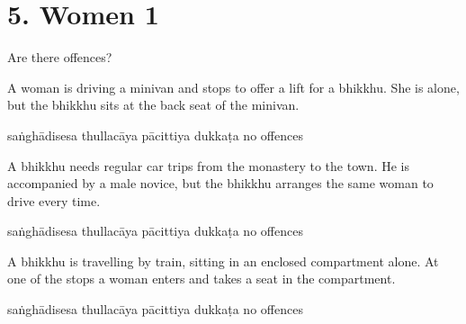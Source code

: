 \chapter{5. Women 1}
\renewcommand*{\theChapterTitle}{5. Women 1}

\begin{exam}{\autoExamName}

\begin{problem*}

Are there offences?

\begin{parts}

\item A woman is driving a minivan and stops to offer a lift for a bhikkhu.
  She is alone, but the bhikkhu sits at the back seat of the minivan.

  \bigskip

  \begin{answers}{5}
    \bChoices
     saṅghādisesa\eAns
     thullacāya\eAns
     pācittiya\eAns
     dukkaṭa\eAns
     no offences\eAns
    \eChoices
  \end{answers}

  \bigskip

\item A bhikkhu needs regular car trips from the monastery to the town. He is
  accompanied by a male novice, but the bhikkhu arranges the same woman to drive
  every time.

  \bigskip

  \begin{answers}{5}
    \bChoices
     saṅghādisesa\eAns
     thullacāya\eAns
     pācittiya\eAns
     dukkaṭa\eAns
     no offences\eAns
    \eChoices
  \end{answers}

  \bigskip

\item A bhikkhu is travelling by train, sitting in an enclosed compartment alone.
  At one of the stops a woman enters and takes a seat in the compartment.

  \bigskip

  \begin{answers}{5}
    \bChoices
     saṅghādisesa\eAns
     thullacāya\eAns
     pācittiya\eAns
     dukkaṭa\eAns
     no offences\eAns
    \eChoices
  \end{answers}

  \bigskip


\end{parts}
\end{problem*}
\end{exam}
